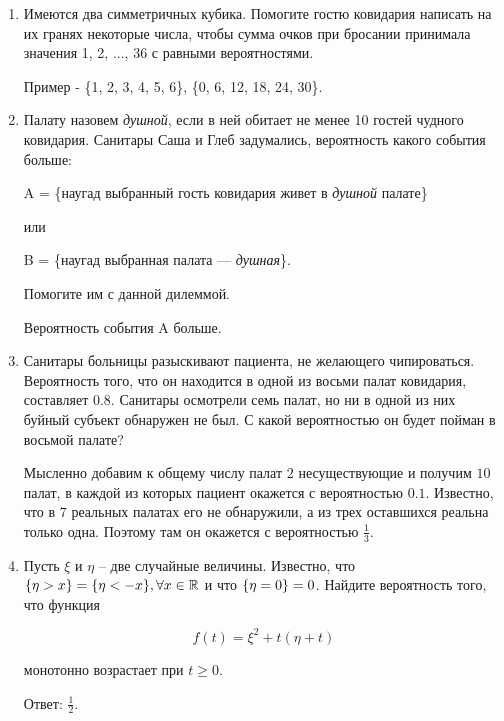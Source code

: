 \documentclass[12pt]{article}
\let\P\relax
\DeclareMathOperator{\P}{\mathbb{P}}
\newenvironment{solution}{}{}
\begin{document}
\begin{enumerate}
    \item Имеются два симметричных кубика. Помогите гостю ковидария написать на их гранях некоторые числа, чтобы сумма очков при бросании принимала значения 1, 2, ..., 36 с равными вероятностями.
    
\begin{solution}
    Пример - \{1, 2, 3, 4, 5, 6\}, \{0, 6, 12, 18, 24, 30\}.
\end{solution}

    \item Палату назовем \textit{душной}, если в ней обитает не менее 10 гостей чудного ковидария. Санитары Саша и Глеб задумались, вероятность какого события больше:
    
    A = \{наугад выбранный гость ковидария живет в \textit{душной} палате\}
    
    или
    
    B = \{наугад выбранная палата — \textit{душная}\}.
    
    Помогите им с данной дилеммой.
    
\begin{solution}
    Вероятность события A больше.
\end{solution}
    
    \item Санитары больницы разыскивают пациента, не желающего чипироваться. Вероятность того, что он находится в одной из восьми палат ковидария, составляет $0.8$. Санитары осмотрели семь палат, но ни в одной из них буйный субъект обнаружен не был. С какой вероятностью он будет пойман в восьмой палате?
    
\begin{solution}
     Мысленно добавим к общему числу палат $2$ несуществующие и получим $10$ палат, в каждой из которых пациент окажется с вероятностью $0.1$. Известно, что в $7$ реальных палатах его не обнаружили, а из трех оставшихся реальна только одна. Поэтому там он окажется с вероятностью $\frac{1}{3}$.
\end{solution}

    \item Пусть $\xi$ и $\eta$ -- две случайные величины. Известно, что $\P\{\eta>x\} = \P\{\eta<-x\}, \forall x \in \mathbb{R}$ и что $\P\{\eta = 0\} = 0$. Найдите вероятность того, что функция
    
    $$f(t) = \xi^2 + t(\eta + t)$$
    
    монотонно возрастает при $t \geq 0$.
    
\begin{solution}
    Ответ: $\frac{1}{2}$.
\end{solution}
    

\end{enumerate}
\end{document}
